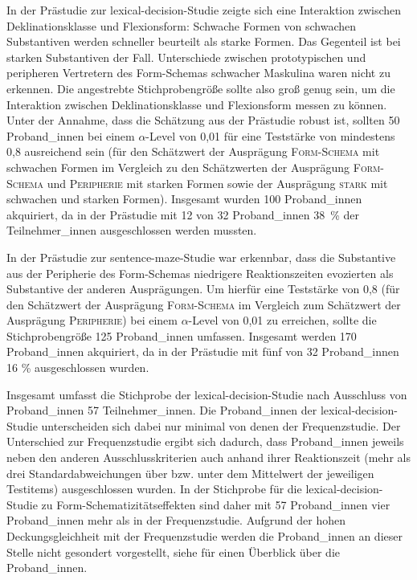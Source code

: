 In der Prästudie zur lexical-decision-Studie zeigte sich eine Interaktion zwischen Deklina\-tionsklasse und Flexionsform: Schwache Formen von schwachen Substantiven werden schneller beurteilt als starke Formen. Das Gegenteil ist bei starken Substantiven der Fall. Unterschiede zwischen prototypischen und peripheren Vertretern des Form-Schemas schwacher Maskulina waren nicht zu erkennen. Die angestrebte Stichprobengröße sollte also groß genug sein, um die Interaktion zwischen Deklinationsklasse und Flexionsform messen zu können. Unter der Annahme, dass die Schätzung aus der Prästudie robust ist, sollten  50 Proband\_innen bei einem $\alpha$-Level von 0,01 für eine Teststärke von mindestens 0,8 ausreichend sein (für den Schätzwert der Ausprägung \textsc{Form-Schema} mit schwachen Formen im Vergleich zu den Schätzwerten der Ausprägung \textsc{Form-Schema} und \textsc{Peripherie} mit starken Formen sowie der Ausprägung \textsc{stark} mit schwachen und starken Formen). Insgesamt wurden 100 Proband\_innen akquiriert, da in der Prästudie mit 12 von 32 Proband\_innen 38~\% der Teilnehmer\_innen ausgeschlossen werden mussten. 


In der Prästudie zur sentence-maze-Studie war erkennbar, dass die Substantive aus der Peripherie des Form-Schemas niedrigere Reaktionszeiten evozierten als Substantive der anderen Ausprägungen. Um hierfür eine Teststärke von 0,8 (für den Schätzwert der Ausprägung \textsc{Form-Schema} im Vergleich zum Schätzwert der Ausprägung \textsc{Peripherie}) bei einem $\alpha$-Level von 0,01 zu erreichen, sollte die Stichprobengröße 125 Proband\_innen umfassen. Insgesamt werden 170 Proband\_innen akquiriert, da in der Prästudie mit fünf von 32 Proband\_innen 16 \% ausgeschlossen wurden.  

Insgesamt umfasst die Stichprobe der lexical-decision-Studie nach Aus\-schluss von Proband\_innen 57 Teilnehmer\_innen. Die Proband\_innen der lexical-de\-ci\-sion-Studie unterscheiden sich dabei nur minimal von denen der Frequenzstudie. Der Unterschied zur Frequenzstudie ergibt sich dadurch, dass Proband\_innen jeweils neben den anderen Ausschlusskriterien auch anhand ihrer Reaktionszeit (mehr als drei Standardabweichungen über bzw. unter dem Mittelwert der jeweiligen Test\-items) ausgeschlossen wurden. In der Stichprobe für die lexical-decision-Studie zu Form-Schematizitätseffekten sind daher mit 57 Proband\_innen vier Proband\_innen mehr als in der Frequenzstudie. Aufgrund der hohen Deckungsgleichheit mit der Frequenzstudie werden die Proband\_innen an dieser Stelle nicht gesondert vorgestellt, siehe  für einen Überblick über die Proband\_innen. 

